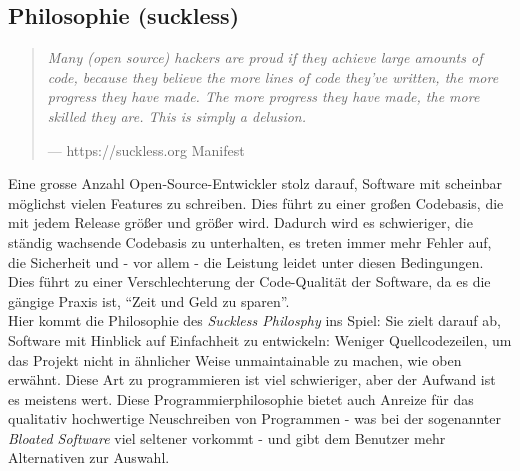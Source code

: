 \documentclass[a4paper,11pt]{article}
\newenvironment{nicequote}[2]{
    \begin{center}\begin{quote}\textit{#1}\\\par\raggedleft--- {#2}
    }{
    \end{quote}\end{center}
}
\begin{document}
\subsection{Philosophie (suckless)}

\begin{nicequote}{Many (open source) hackers are proud if they achieve large amounts of code, because they believe the more lines of code they've written, the more progress they have made. The more progress they have made, the more skilled they are. This is simply a delusion.}{https://suckless.org Manifest \cite{suckless}}
\end{nicequote}


Eine grosse Anzahl Open-Source-Entwickler stolz darauf, Software mit scheinbar möglichst vielen Features zu schreiben. Dies führt zu einer großen Codebasis, die mit jedem Release größer und größer wird. Dadurch wird es schwieriger, die ständig wachsende Codebasis zu unterhalten, es treten immer mehr Fehler auf, die Sicherheit und - vor allem - die Leistung leidet unter diesen Bedingungen. Dies führt zu einer Verschlechterung der Code-Qualität der Software, da es die gängige Praxis ist, ``Zeit und Geld zu sparen''.\\



Hier kommt die Philosophie des \textit{Suckless Philosphy} ins Spiel: Sie zielt darauf ab, Software mit Hinblick auf Einfachheit zu entwickeln: Weniger Quellcodezeilen, um das Projekt nicht in ähnlicher Weise unmaintainable zu machen, wie oben erwähnt. Diese Art zu programmieren ist viel schwieriger, aber der Aufwand ist es meistens wert. Diese Programmierphilosophie bietet auch Anreize für das qualitativ hochwertige Neuschreiben von Programmen - was bei der sogenannter \textit{Bloated Software} viel seltener vorkommt - und gibt dem Benutzer mehr Alternativen zur Auswahl.
\end{document}
